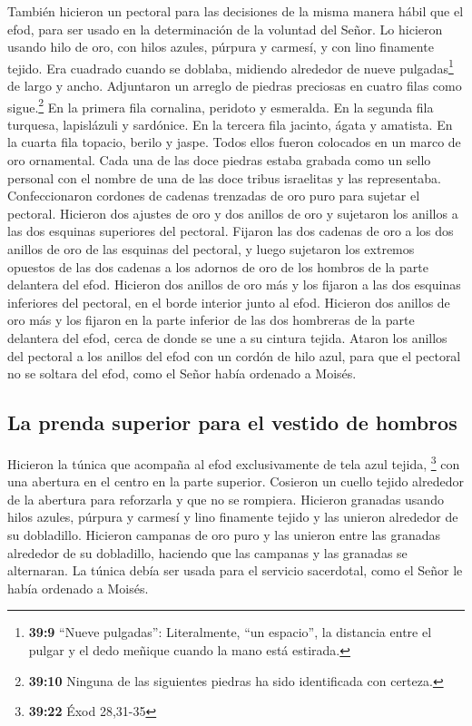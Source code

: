  También hicieron un pectoral para las decisiones de la
misma manera hábil que el efod, para ser usado en la determinación de la
voluntad del Señor. Lo hicieron usando hilo de oro, con hilos azules,
púrpura y carmesí, y con lino finamente tejido.  Era
cuadrado cuando se doblaba, midiendo alrededor de nueve
pulgadas\footnote{\textbf{39:9} ``Nueve pulgadas'': Literalmente, ``un
  espacio'', la distancia entre el pulgar y el dedo meñique cuando la
  mano está estirada.} de largo y ancho.  Adjuntaron un
arreglo de piedras preciosas en cuatro filas como sigue.\footnote{\textbf{39:10}
  Ninguna de las siguientes piedras ha sido identificada con certeza.}
En la primera fila cornalina, peridoto y esmeralda.  En
la segunda fila turquesa, lapislázuli y sardónice.  En la
tercera fila jacinto, ágata y amatista.  En la cuarta
fila topacio, berilo y jaspe. Todos ellos fueron colocados en un marco
de oro ornamental.  Cada una de las doce piedras estaba
grabada como un sello personal con el nombre de una de las doce tribus
israelitas y las representaba.  Confeccionaron cordones
de cadenas trenzadas de oro puro para sujetar el pectoral.
 Hicieron dos ajustes de oro y dos anillos de oro y
sujetaron los anillos a las dos esquinas superiores del pectoral.
 Fijaron las dos cadenas de oro a los dos anillos de oro
de las esquinas del pectoral,  y luego sujetaron los
extremos opuestos de las dos cadenas a los adornos de oro de los hombros
de la parte delantera del efod.  Hicieron dos anillos de
oro más y los fijaron a las dos esquinas inferiores del pectoral, en el
borde interior junto al efod.  Hicieron dos anillos de
oro más y los fijaron en la parte inferior de las dos hombreras de la
parte delantera del efod, cerca de donde se une a su cintura tejida.
 Ataron los anillos del pectoral a los anillos del efod
con un cordón de hilo azul, para que el pectoral no se soltara del efod,
como el Señor había ordenado a Moisés.

\hypertarget{la-prenda-superior-para-el-vestido-de-hombros-1}{%
\subsection{La prenda superior para el vestido de
hombros}\label{la-prenda-superior-para-el-vestido-de-hombros-1}}

 Hicieron la túnica que acompaña al efod exclusivamente
de tela azul tejida, \footnote{\textbf{39:22} Éxod 28,31-35}
 con una abertura en el centro en la parte superior.
Cosieron un cuello tejido alrededor de la abertura para reforzarla y que
no se rompiera.  Hicieron granadas usando hilos azules,
púrpura y carmesí y lino finamente tejido y las unieron alrededor de su
dobladillo.  Hicieron campanas de oro puro y las unieron
entre las granadas alrededor de su dobladillo,  haciendo
que las campanas y las granadas se alternaran. La túnica debía ser usada
para el servicio sacerdotal, como el Señor le había ordenado a Moisés.

